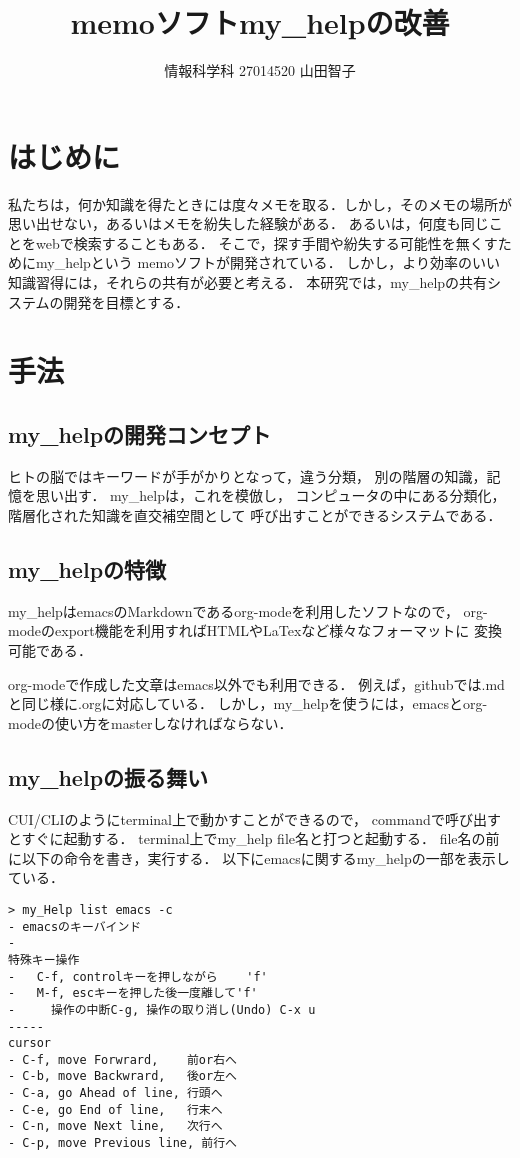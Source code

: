 \documentclass[a4j,twocolumn]{jsarticle}
\begin{document}
\title{memoソフトmy\_helpの改善}
\author{情報科学科 \hspace{5mm} 27014520 \hspace{5mm}山田智子}
\date{}
\maketitle

\section{はじめに}
私たちは，何か知識を得たときには度々メモを取る．しかし，そのメモの場所が思い出せない，あるいはメモを紛失した経験がある．
あるいは，何度も同じことをwebで検索することもある．
そこで，探す手間や紛失する可能性を無くすためにmy\_helpという
memoソフトが開発されている\cite{my_help}．
しかし，より効率のいい知識習得には，それらの共有が必要と考える．
本研究では，my\_helpの共有システムの開発を目標とする．

\section{手法}
\subsection{my\_helpの開発コンセプト}
\label{sec-2-1}
ヒトの脳ではキーワードが手がかりとなって，違う分類，
別の階層の知識，記憶を思い出す．
my\_helpは，これを模倣し，
コンピュータの中にある分類化，階層化された知識を直交補空間として
呼び出すことができるシステムである．

\subsection{my\_helpの特徴}
\label{sec-2-2}
my\_helpはemacsのMarkdownであるorg-modeを利用したソフトなので，
org-modeのexport機能を利用すればHTMLやLaTexなど様々なフォーマットに
変換可能である\cite{}．

org-modeで作成した文章はemacs以外でも利用できる．
例えば，githubでは.mdと同じ様に.orgに対応している．
しかし，my\_helpを使うには，emacsとorg-modeの使い方をmasterしなければならない．

\subsection{my\_helpの振る舞い}
\label{sec-2-3}
CUI/CLIのようにterminal上で動かすことができるので，
commandで呼び出すとすぐに起動する．
terminal上でmy\_help file名と打つと起動する．
file名の前に以下の命令を書き，実行する．
以下にemacsに関するmy\_helpの一部を表示している．
{\small\setlength\baselineskip{10pt}	%
\begin{verbatim}
> my_Help list emacs -c
- emacsのキーバインド
- 
特殊キー操作
-   C-f, controlキーを押しながら    'f'
-   M-f, escキーを押した後一度離して'f'
-     操作の中断C-g, 操作の取り消し(Undo) C-x u
-----
cursor
- C-f, move Forwrard,    前or右へ
- C-b, move Backwrard,   後or左へ
- C-a, go Ahead of line, 行頭へ
- C-e, go End of line,   行末へ
- C-n, move Next line,   次行へ
- C-p, move Previous line, 前行へ
\end{verbatim}
}
\end{document}

